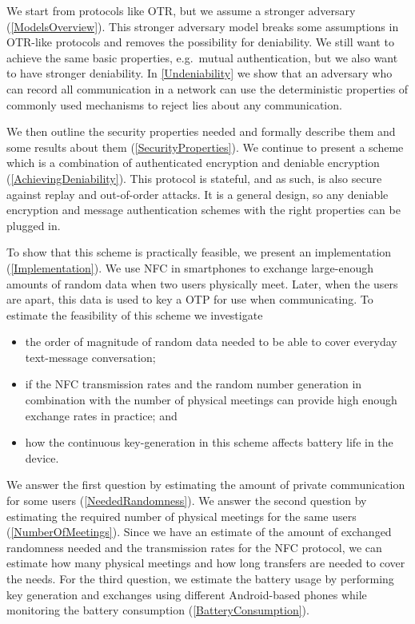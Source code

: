 We start from protocols like \ac{OTR}, but we assume a stronger adversary 
(\cref{ModelsOverview}).
This stronger adversary model breaks some assumptions in \ac{OTR}-like 
protocols and removes the possibility for deniability.
We still want to achieve the same basic properties, e.g.~mutual authentication, 
but we also want to have stronger deniability.
In \cref{Undeniability} we show that an adversary who can record all 
communication in a network can use the deterministic properties of commonly 
used mechanisms to reject lies about any communication.

We then outline the security properties needed and formally describe them and 
some results about them (\cref{SecurityProperties}).
We continue to present a scheme which is a combination of authenticated 
encryption and deniable encryption (\cref{AchievingDeniability}).
This protocol is stateful, and as such, is also secure against replay and 
out-of-order attacks.
It is a general design, so any deniable encryption and message authentication 
schemes with the right properties can be plugged in.

To show that this scheme is practically feasible, we present an implementation 
(\cref{Implementation}).
We use \ac{NFC} in smartphones to exchange large-enough amounts of random data 
when two users physically meet.
Later, when the users are apart, this data is used to key a \ac{OTP} for use 
when communicating.
To estimate the feasibility of this scheme we investigate
\begin{itemize}
  \item the order of magnitude of random data needed to be able to cover 
    everyday text-message conversation;

  \item if the \ac{NFC} transmission rates and the random number generation in 
    combination with the number of physical meetings can provide high enough 
    exchange rates in practice; and

  \item how the continuous key-generation in this scheme affects battery life 
    in the device.
\end{itemize}

We answer the first question by estimating the amount of private communication 
for some users (\cref{NeededRandomness}).
We answer the second question by estimating the required number of physical 
meetings for the same users (\cref{NumberOfMeetings}).
Since we have an estimate of the amount of exchanged randomness needed and the 
transmission rates for the \ac{NFC} protocol, we can estimate how many physical 
meetings and how long transfers are needed to cover the needs.
For the third question, we estimate the battery usage by performing key 
generation and exchanges using different Android-based phones while monitoring 
the battery consumption (\cref{BatteryConsumption}).


